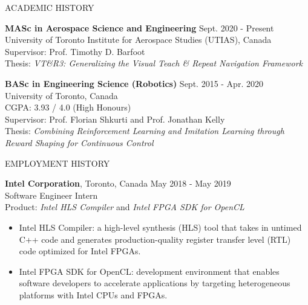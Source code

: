 \documentclass{cv}
\begin{document}

\begin{rSection}{ACADEMIC HISTORY}
  \item {\bf MASc in Aerospace Science and Engineering} \hfill {Sept. 2020 - Present}\\
  University of Toronto Institute for Aerospace Studies (UTIAS), Canada\\
  Supervisor: Prof. Timothy D. Barfoot\\
  Thesis: \textit{VT\&R3: Generalizing the Visual Teach \& Repeat Navigation Framework}

  \item {\bf BASc in Engineering Science (Robotics)} \hfill {Sept. 2015 - Apr. 2020}\\
  University of Toronto, Canada\\
  CGPA: 3.93 / 4.0 (High Honours)\\
  Supervisor: Prof. Florian Shkurti and Prof. Jonathan Kelly\\
  Thesis: \textit{Combining Reinforcement Learning and Imitation Learning through Reward Shaping for Continuous Control}
\end{rSection}

\begin{rSection}{EMPLOYMENT HISTORY}
  \item \textbf{Intel Corporation}, Toronto, Canada  \hfill {May 2018 - May 2019}\\
  Software Engineer Intern\\
  Product: \textit{Intel HLS Compiler} and \textit{Intel FPGA SDK for OpenCL}
  \vspace{-0.5em}
  \begin{itemize}[noitemsep,topsep=0pt]
    \item Intel HLS Compiler: a high-level synthesis (HLS) tool that takes in untimed C++ code and generates production-quality register transfer level (RTL) code optimized for Intel FPGAs.
    \item Intel FPGA SDK for OpenCL: development environment that enables software developers to accelerate applications by targeting heterogeneous platforms with Intel CPUs and FPGAs.
  \end{itemize}
\end{rSection}
\end{document}
